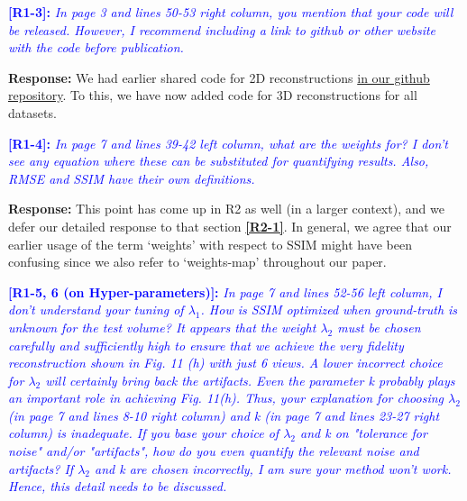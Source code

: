 \documentclass[11pt]{article}
\begin{document}
  \vspace{0.5cm}\textcolor{blue}{\textbf{[R1-3]:} \textit{In page 3 and lines 50-53
      right column, you mention that your code will be
      released. However, I recommend including a link to github or
      other website with the code before publication.}} 

  \textbf{Response:} We had earlier shared code for 2D reconstructions
  \href{https://github.com/preetigopal/Weighted-Prior-Tomographic-Reconstruction}{in
    our github repository}. To this, we have now added code for 3D
  reconstructions for all datasets.

  \vspace{0.5cm}\textcolor{blue}{\textbf{[R1-4]:} \textit{In page 7 and lines 39-42
      left column, what are the weights for? I don't see any equation
      where these can be substituted for quantifying results. Also,
      RMSE and \hypertarget{ssim-R1}{SSIM have their own definitions}.}}

  \textbf{Response:} This point has come up in R2 as well (in a larger
  context), and we defer our detailed response to that section \textcolor{blue}{\textbf{\hyperlink{ssim}{[R2-1]}}}. In
  general, we agree that our earlier usage of the term `weights' with
  respect to SSIM might have been confusing since we also refer to
  `weights-map' throughout our paper.
  

  \vspace{0.5cm}\textcolor{blue}{\textbf{\hypertarget{hyperparameters}{[R1-5, 6 (on Hyper-parameters)]:}} \textit{In
      page 7 and lines 52-56 left column, I don't understand your
      tuning of $\lambda_1$. How is SSIM optimized when ground-truth
      is unknown for the test volume?  It appears that the weight
      $\lambda_2$ must be chosen carefully and sufficiently high to
      ensure that we achieve the very fidelity reconstruction shown in
      Fig. 11 (h) with just 6 views. A lower incorrect choice for
      $\lambda_2$ will certainly bring back the artifacts. Even the
      parameter k probably plays an important role in achieving
      Fig. 11(h). Thus, your explanation for choosing $\lambda_2$ (in
      page 7 and lines 8-10 right column) and k (in page 7 and lines
      23-27 right column) is inadequate. If you base your choice of
      $\lambda_2$ and k on "tolerance for noise" and/or "artifacts",
      how do you even quantify the relevant noise and artifacts? If
      $\lambda_2$ and k are chosen incorrectly, I am sure your method
      won't work. Hence, this detail needs to be discussed.}}
\end{document}
